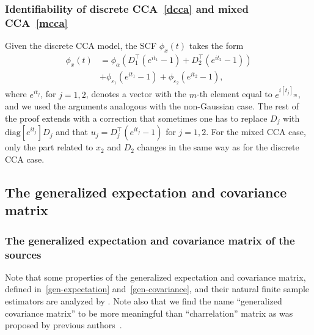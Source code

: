 \documentclass{article}
\newcommand{\one}{1}
\newcommand{\diag}{\mathrm{diag}}
\begin{document}
\subsubsection{Identifiability of discrete CCA~\eqref{dcca} and mixed CCA~\eqref{mcca}}
Given the discrete CCA model, the SCF $\phi_x(t)$ takes the form
$$
\begin{aligned}
\phi_x(t) &= \phi_{\alpha} (D_1^{\top}(e^{it_1}-\one)+D_2^{\top}(e^{it_2}-\one))\\
&+ \phi_{\varepsilon_1}(e^{it_1}-\one) + \phi_{\varepsilon_2}(e^{it_2}-\one),
\end{aligned}
$$
where $e^{it_j}$, for $j=1,2$,  denotes a vector with the $m$-th element equal to $e^{i[t_j]_m}$, and we used the arguments analogous with the non-Gaussian case. The rest of the proof extends with a correction that sometimes one has to replace $D_j$ with $\diag[e^{it_j}]D_j$ and that $u_j =D_j^{\top}(e^{it_j}-\one)$ for $j=1,2$. For the mixed CCA case, only the part related to $x_2$ and $D_2$ changes in the same way as for the discrete CCA case.






















\subsection{The generalized expectation and covariance matrix}
\label{app:generalized-E-cov}


\subsubsection{The generalized expectation and covariance matrix of the sources}
\label{app:gen-cums-alpha}
Note that some properties of the generalized expectation and covariance matrix, defined in~\eqref{gen-expectation} and~\eqref{gen-covariance}, and their natural finite sample estimators are analyzed by \citet{SlaYer2012b}. Note also that we find the name ``generalized covariance matrix'' to be more meaningful than ``charrelation'' matrix as was proposed by previous authors~\citep[see, e.g.][]{SlaYer2012,SlaYer2012b}.
\end{document}
